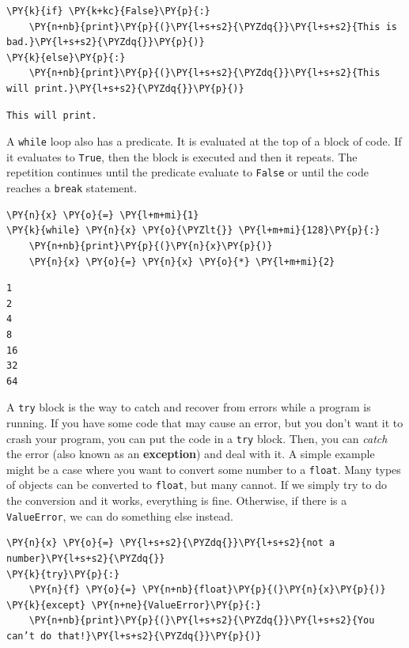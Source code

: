 \begin{Verbatim}[commandchars=\\\{\}]
\PY{k}{if} \PY{k+kc}{False}\PY{p}{:}
    \PY{n+nb}{print}\PY{p}{(}\PY{l+s+s2}{\PYZdq{}}\PY{l+s+s2}{This is bad.}\PY{l+s+s2}{\PYZdq{}}\PY{p}{)}
\PY{k}{else}\PY{p}{:}
    \PY{n+nb}{print}\PY{p}{(}\PY{l+s+s2}{\PYZdq{}}\PY{l+s+s2}{This will print.}\PY{l+s+s2}{\PYZdq{}}\PY{p}{)}
\end{Verbatim}

\begin{Verbatim}
This will print.
\end{Verbatim}


A \texttt{while} loop also has a predicate.  It is evaluated at the top of a block of code.  If it evaluates to \texttt{True}, then the block is executed and then it repeats.  The repetition continues until the predicate evaluate to \texttt{False} or until the code reaches a \texttt{break} statement.


\begin{Verbatim}[commandchars=\\\{\}]
\PY{n}{x} \PY{o}{=} \PY{l+m+mi}{1}
\PY{k}{while} \PY{n}{x} \PY{o}{\PYZlt{}} \PY{l+m+mi}{128}\PY{p}{:}
    \PY{n+nb}{print}\PY{p}{(}\PY{n}{x}\PY{p}{)}
    \PY{n}{x} \PY{o}{=} \PY{n}{x} \PY{o}{*} \PY{l+m+mi}{2}
\end{Verbatim}

\begin{Verbatim}
1
2
4
8
16
32
64
\end{Verbatim}


A \texttt{try} block is the way to catch and recover from errors while a program is running.  If you have some code that may cause an error, but you don’t want it to crash your program, you can put the code in a \texttt{try} block.  Then, you can \emph{catch} the error (also known as an \textbf{exception}) and deal with it.  A simple example might be a case where you want to convert some number to a \texttt{float}.  Many types of objects can be converted to \texttt{float}, but many cannot.  If we simply try to do the conversion and it works, everything is fine.  Otherwise, if there is a \texttt{ValueError}, we can do something else instead.  


\begin{Verbatim}[commandchars=\\\{\}]
\PY{n}{x} \PY{o}{=} \PY{l+s+s2}{\PYZdq{}}\PY{l+s+s2}{not a number}\PY{l+s+s2}{\PYZdq{}}
\PY{k}{try}\PY{p}{:}
    \PY{n}{f} \PY{o}{=} \PY{n+nb}{float}\PY{p}{(}\PY{n}{x}\PY{p}{)}
\PY{k}{except} \PY{n+ne}{ValueError}\PY{p}{:}
    \PY{n+nb}{print}\PY{p}{(}\PY{l+s+s2}{\PYZdq{}}\PY{l+s+s2}{You can’t do that!}\PY{l+s+s2}{\PYZdq{}}\PY{p}{)}
\end{Verbatim}

